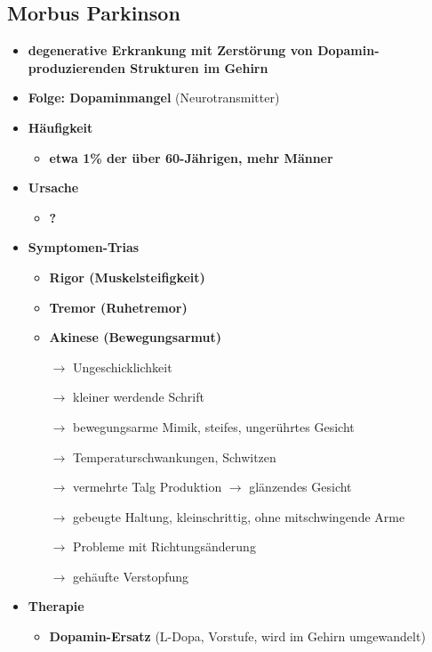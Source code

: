 \subsection{Morbus Parkinson}
	\begin{itemize}
		\item \textbf{degenerative Erkrankung mit Zerstörung von Dopamin-produzierenden Strukturen im Gehirn}
		\item \textbf{Folge: Dopaminmangel} (Neurotransmitter)
		\item \textbf{Häufigkeit}
			\begin{itemize}
				\item \textbf{etwa 1\% der über 60-Jährigen, mehr Männer}
			\end{itemize}
		\item \textbf{Ursache}
			\begin{itemize}
				\item \textbf{?}
			\end{itemize}
		\item \textbf{Symptomen-Trias}
			\begin{itemize}
				\item \textbf{Rigor (Muskelsteifigkeit)}
				\item \textbf{Tremor (Ruhetremor)}
				\item \textbf{Akinese (Bewegungsarmut)}
				\item[$\rightarrow$] Ungeschicklichkeit
				\item[$\rightarrow$] kleiner werdende Schrift
				\item[$\rightarrow$] bewegungsarme Mimik, steifes, ungerührtes Gesicht
				\item[$\rightarrow$] Temperaturschwankungen, Schwitzen
				\item[$\rightarrow$] vermehrte Talg Produktion $\rightarrow$ glänzendes Gesicht
				\item[$\rightarrow$] gebeugte Haltung, kleinschrittig, ohne mitschwingende Arme
				\item[$\rightarrow$] Probleme mit Richtungsänderung
				\item[$\rightarrow$] gehäufte Verstopfung
			\end{itemize}
		\item \textbf{Therapie}
			\begin{itemize}
				\item \textbf{Dopamin-Ersatz} (L-Dopa, Vorstufe, wird im Gehirn umgewandelt)
			\end{itemize}
	\end{itemize}
	
